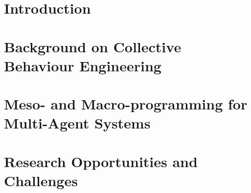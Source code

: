 \documentclass[sigconf,anonymous]{aamas}
\begin{document}
\section{Introduction}
\label{sec:intro}

\cite{DBLP:journals/csur/Casadei23}

\section{Background on Collective Behaviour Engineering}

\section{Meso- and Macro-programming for Multi-Agent Systems}

\section{Research Opportunities and Challenges}
\end{document}
